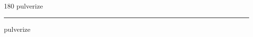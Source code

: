 
\begin{frame}
\begin{center}
\begin{turn}{180}
{\fontsize{2.5cm}{1em}\selectfont pulverize}
\end{turn}
\vspace{1em}\par  
\hrule
\vspace{1em}\par  
{\fontsize{2.5cm}{1em}\selectfont pulverize}
\end{center}
\end{frame}

